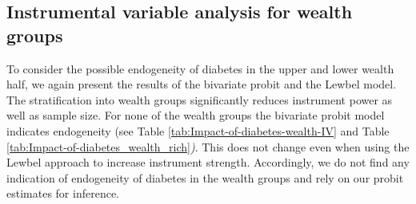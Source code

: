 \clearpage

\subsection*{Instrumental variable analysis for wealth groups}


To consider the possible endogeneity of diabetes in the upper and
lower wealth half, we again present the results of the bivariate probit
and the Lewbel model. The stratification into wealth groups significantly
reduces instrument power as well as sample size. For none of the wealth
groups the bivariate probit model indicates endogeneity (see Table
\ref{tab:Impact-of-diabetes-wealth-IV} and Table \ref{tab:Impact-of-diabetes_wealth_rich}\emph{)}.
This does not change even when using the Lewbel approach to increase
instrument strength. Accordingly, we do not find any indication of
endogeneity of diabetes in the wealth groups and rely on our probit
estimates for inference.

